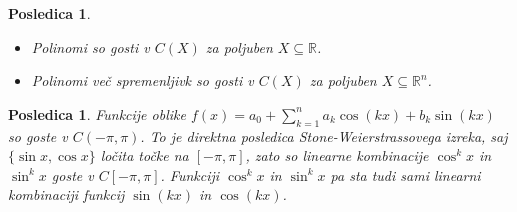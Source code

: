 \documentclass[10pt, a4paper]{article}
\newtheorem{posledica}[izr]{Posledica}
\newcommand{\R}{\mathbb {R}}
\begin{document}
\begin{posledica}
  \begin{itemize}
    \item Polinomi so gosti v $C(X)$ za poljuben $X \subseteq \R$.
    \item Polinomi več spremenljivk so gosti v $C(X)$ za poljuben $X \subseteq \R^n$.
  \end{itemize}
\end{posledica}

\begin{posledica}
  Funkcije oblike $f(x) = a_0 + \sum_{k = 1} ^n a_k \cos (kx) + b_k \sin (kx)$ so goste v $C(-\pi, \pi)$.
  To je direktna posledica Stone-Weierstrassovega izreka, saj $\{\sin x, \cos x\}$ ločita točke na 
  $[-\pi, \pi]$, zato so linearne kombinacije $\cos^{k} x$ in $\sin^k x$ goste v $C[-\pi, \pi]$.
  Funkciji $\cos^k x$ in $\sin^k x$ pa sta tudi sami linearni kombinaciji funkcij $\sin(kx)$ in $\cos (kx)$.
\end{posledica}
\end{document}
